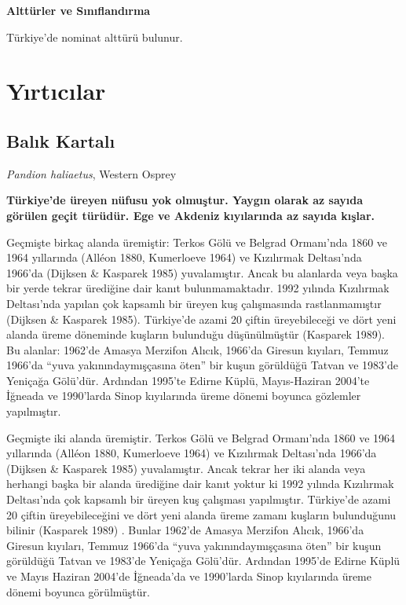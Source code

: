 \documentclass[
  letterpaper,
  DIV=11,
  numbers=noendperiod]{scrreprt}
\begin{document}
\textbf{Alttürler ve Sınıflandırma}

Türkiye'de nominat alttürü bulunur.


\chapter{Yırtıcılar}\label{yux131rtux131cux131lar}

\section{Balık Kartalı}\label{balux131k-kartalux131}

\emph{Pandion haliaetus}, Western Osprey

\textbf{Türkiye'de üreyen nüfusu yok olmuştur. Yaygın olarak az sayıda
görülen geçit türüdür. Ege ve Akdeniz kıyılarında az sayıda kışlar.}

Geçmişte birkaç alanda üremiştir: Terkos Gölü ve Belgrad Ormanı'nda 1860
ve 1964 yıllarında (Alléon 1880, Kumerloeve 1964) ve Kızılırmak
Deltası'nda 1966'da (Dijksen \& Kasparek 1985) yuvalamıştır. Ancak bu
alanlarda veya başka bir yerde tekrar ürediğine dair kanıt
bulunmamaktadır. 1992 yılında Kızılırmak Deltası'nda yapılan çok
kapsamlı bir üreyen kuş çalışmasında rastlanmamıştır (Dijksen \&
Kasparek 1985). Türkiye'de azami 20 çiftin üreyebileceği ve dört yeni
alanda üreme döneminde kuşların bulunduğu düşünülmüştür (Kasparek 1989).
Bu alanlar: 1962'de Amasya Merzifon Alıcık, 1966'da Giresun kıyıları,
Temmuz 1966'da ``yuva yakınındaymışçasına öten'' bir kuşun görüldüğü
Tatvan ve 1983'de Yeniçağa Gölü'dür. Ardından 1995'te Edirne Küplü,
Mayıs-Haziran 2004'te İğneada ve 1990'larda Sinop kıyılarında üreme
dönemi boyunca gözlemler yapılmıştır.

Geçmişte iki alanda üremiştir. Terkos Gölü ve Belgrad Ormanı'nda 1860 ve
1964 yıllarında (Alléon 1880, Kumerloeve 1964) ve Kızılırmak Deltası'nda
1966'da (Dijksen \& Kasparek 1985) yuvalamıştır. Ancak tekrar her iki
alanda veya herhangi başka bir alanda ürediğine dair kanıt yoktur ki
1992 yılında Kızılırmak Deltası'nda çok kapsamlı bir üreyen kuş
çalışması yapılmıştır. Türkiye'de azami 20 çiftin üreyebileceğini ve
dört yeni alanda üreme zamanı kuşların bulunduğunu bilinir (Kasparek
1989) . Bunlar 1962'de Amasya Merzifon Alıcık, 1966'da Giresun kıyıları,
Temmuz 1966'da ``yuva yakınındaymışçasına öten'' bir kuşun görüldüğü
Tatvan ve 1983'de Yeniçağa Gölü'dür. Ardından 1995'de Edirne Küplü ve
Mayıs Haziran 2004'de İğneada'da ve 1990'larda Sinop kıyılarında üreme
dönemi boyunca görülmüştür.
\end{document}
